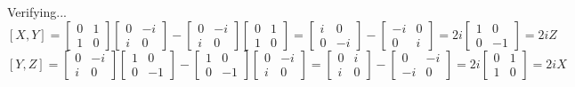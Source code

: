 \documentclass[12pt]{exam}
\begin{document}
\begin{solution}
Verifying...
    $$
    [X,Y] = \begin{bmatrix}
        0 & 1 \\ 1 & 0
    \end{bmatrix}\begin{bmatrix}
        0 & -i \\ i & 0
    \end{bmatrix}-\begin{bmatrix}
        0 & -i \\ i & 0
    \end{bmatrix}\begin{bmatrix}
        0 & 1 \\ 1 & 0
    \end{bmatrix} =\begin{bmatrix}
        i & 0 \\ 0 & -i
    \end{bmatrix}-\begin{bmatrix}
        -i & 0 \\ 0 & i
    \end{bmatrix}=2i\begin{bmatrix}
        1 & 0 \\ 0 & -1
    \end{bmatrix}=2iZ$$
    $$
    [Y,Z] = \begin{bmatrix}
        0 & -i \\ i & 0
    \end{bmatrix}\begin{bmatrix}
        1 & 0 \\ 0 & -1
    \end{bmatrix}-\begin{bmatrix}
        1 & 0 \\ 0 & -1
    \end{bmatrix}\begin{bmatrix}
        0 & -i \\ i & 0
    \end{bmatrix} = \begin{bmatrix}
        0 & i \\ i & 0
    \end{bmatrix}-\begin{bmatrix}
        0 & -i \\ -i & 0
    \end{bmatrix} =2i\begin{bmatrix}
        0 & 1 \\ 1 & 0
    \end{bmatrix}=2iX
$$
\end{solution}
\end{document}

